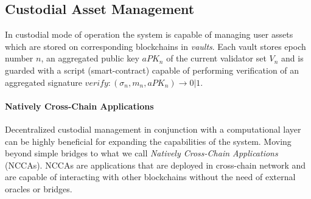 \documentclass{article}
\begin{document}
    \subsection{Custodial Asset Management}\label{subsec:custodial-asset-management}
    In custodial mode of operation the system is capable of managing user assets which are stored on corresponding blockchains in \emph{vaults}.
    Each vault stores epoch number $n$, an aggregated public key $aPK_n$ of the current validator set $V_n$ and
    is guarded with a script (smart-contract) capable of performing verification of
    an aggregated signature $verify: (\sigma_n, m_n, aPK_n) \rightarrow 0 | 1$.

    \paragraph{Natively Cross-Chain Applications}
    Decentralized custodial management in conjunction with a computational layer can be highly beneficial for expanding the capabilities of the system.
    Moving beyond simple bridges to what we call \emph{Natively Cross-Chain Applications} (NCCAs).
    NCCAs are applications that are deployed in cross-chain network and are capable of interacting with other blockchains without the need of external oracles or bridges.
\end{document}
